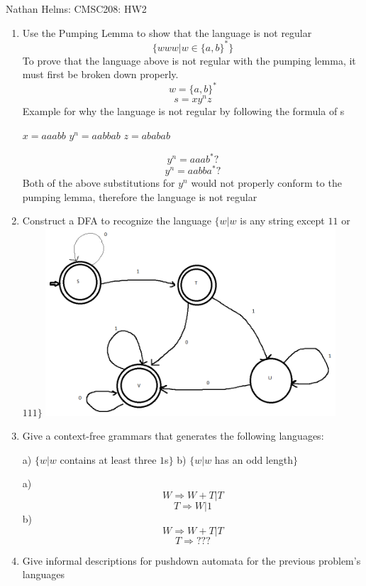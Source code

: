 \documentclass{article}
\begin{document}
Nathan Helms: CMSC208: HW2
\begin{enumerate}
\item
Use the Pumping Lemma to show that the language is not regular
$$\{www | w \in \{a,b\}^\ast\}$$
\newline
To prove that the language above is not regular with the pumping lemma, it must first be broken down properly.
\newline
\newline
$$w = \{a,b\}^\ast$$
$$s = xy^nz$$
Example for why the language is not regular by following the formula of s
\newline
\begin{center}
$x = aaabb$ $y^n = aabbab$ $z = ababab$
\end{center}
$$y^n = aaab^\ast? $$
$$y^n = aabba^\ast? $$
Both of the above substitutions for $y^n$ would not properly conform to the pumping lemma, therefore the language is not regular
\item
Construct a DFA to recognize the language $\{w | w $ is any string except $11$ or $111\}$
\newline
\includegraphics[scale=0.5, height=7cm]{DFA}
\newline
\item
Give a context-free grammars that generates the following languages:
\newline
\begin{center}
a) $\{w | w$ contains at least three $1$s$\}$
b) $\{w | w$ has an odd length$\}$
\end{center}
a) $$W \Rightarrow W + T | T$$
$$T \Rightarrow W | 1$$
b) $$W \Rightarrow W + T | T$$
$$T \Rightarrow ??? $$
\newline
\newline
\item
Give informal descriptions for pushdown automata for the previous problem's languages

\end{enumerate}
\end{document}
